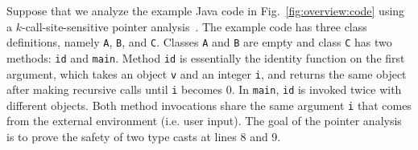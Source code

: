 Suppose that we analyze the example Java code in
Fig.~\ref{fig:overview:code} using a $k$-call-site-sensitive pointer
analysis~\cite{Smaragdakis2015}.  The example code has three class
definitions, namely \texttt{A}, \texttt{B}, and \texttt{C}.  Classes
\texttt{A} and \texttt{B} are empty and class \texttt{C} has two
methods: \texttt{id} and \texttt{main}.  Method \texttt{id} is
essentially the identity function on the first argument, which takes an
object \texttt{v} and an integer \texttt{i}, and returns the same
object after making recursive calls until \texttt{i} becomes 0. In
\texttt{main}, \texttt{id} is invoked twice with different
objects. Both method invocations share the same argument \texttt{i}
that comes from the external environment (i.e. user input).  The goal
of the pointer analysis is to prove the safety of two type casts at
lines 8 and 9.

